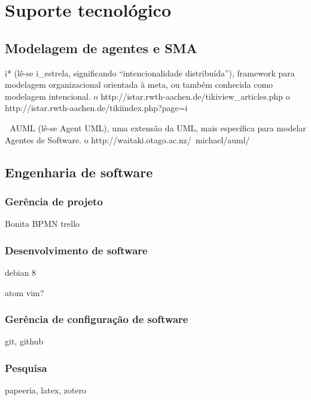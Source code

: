 \chapter[Suporte tecnológico]{Suporte tecnológico}

\section{Modelagem de agentes e SMA}


i* (lê-se i_estrela, significando “intencionalidade distribuída”), framework para modelagem organizacional orientada à meta, ou também conhecida como modelagem intencional.
o http://istar.rwth-aachen.de/tikiview_articles.php
o http://istar.rwth-aachen.de/tikiindex.php?page=i%

 AUML (lê-se Agent UML), uma extensão da UML,
mais específica para modelar Agentes de Software.
o http://waitaki.otago.ac.nz/~michael/auml/



\section{Engenharia de software}

\subsection{Gerência de projeto}

Bonita BPMN
trello

\subsection{Desenvolvimento de software}

debian 8

atom
vim?

\subsection{Gerência de configuração de software}

git, github

\subsection{Pesquisa}

papeeria, latex, zotero

